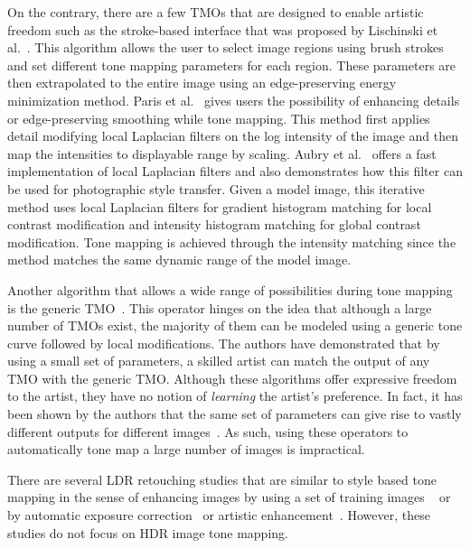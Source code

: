 On the contrary, there are a few TMOs that are designed to enable artistic freedom such as the stroke-based interface that was proposed by Lischinski et al.~\cite{Lischinski2006}. This algorithm allows the user to select image regions using brush strokes and set different tone mapping parameters for each region. These parameters are then extrapolated to the entire image using an edge-preserving energy minimization method. Paris et al.~\cite{paris2011local} gives users the possibility of enhancing details or edge-preserving smoothing while tone mapping. This method first applies detail modifying local Laplacian filters on the log intensity of the image and then map the intensities to displayable range by scaling. Aubry et al.~\cite{aubry2014fast} offers a fast implementation of local Laplacian filters and also demonstrates how this filter can be used for photographic style transfer. Given a model image, this iterative method uses local Laplacian filters for gradient histogram matching for local contrast modification and intensity histogram matching for global contrast modification. Tone mapping is achieved through the intensity matching since the method matches the same dynamic range of the model image.

Another algorithm that allows a wide range of possibilities during tone mapping is the generic TMO~\cite{Mantiuk08a}. This operator hinges on the idea that although a large number of TMOs exist, the majority of them can be modeled using a generic tone curve followed by local modifications. The authors have demonstrated that by using a small set of parameters, a skilled artist can match the output of any TMO with the generic TMO. Although these algorithms offer expressive freedom to the artist, they have no notion of \emph{learning} the artist's preference. In fact, it has been shown by the authors that the same set of parameters can give rise to vastly different outputs for different images~\cite{Mantiuk08a}. As such, using these operators to automatically tone map a large number of images is impractical. 

There are several LDR retouching studies that are similar to style based tone mapping in the sense of enhancing images by using a set of training images ~\cite{kang2010personalization, bychkovsky2011learning} or by automatic exposure correction~\cite{yuan2012automatic} or artistic enhancement~\cite{son2014art}. However, these studies do not focus on HDR image tone mapping.


